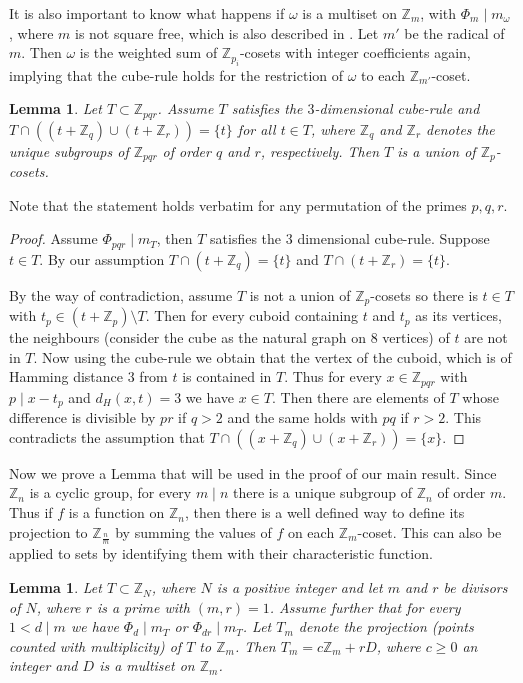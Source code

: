 \documentclass[10pt]{article}
\newcommand{\Z}{\mathbb{Z}}
\newtheorem{lem}[Thme]{Lemma}
\begin{document}
        
        It is also important to know what happens if $\omega$ is a multiset on $\Z_m$, with $\Phi_m \mid m_{\omega}$, where $m$ is not square free, which is also described in \cite{negyen}. Let $m'$ be the radical of $m$. Then $\omega$ is the weighted sum of $\Z_{p_i}$-cosets with integer coefficients again, implying that the cube-rule holds for the restriction of $\omega$ to each $\Z_{m'}$-coset.   
        \begin{lem}\label{lemcuberulecorr}
        Let $T \subset \Z_{pqr}$. Assume $T$ satisfies the $3$-dimensional cube-rule and $T \cap ((t+\Z_q) \cup (t+\Z_r))=\{t\}$ for all $t\in T$, where $\Z_q$ and $\Z_r$ denotes the unique subgroups of $\Z_{pqr}$ of order $q$ and $r$, respectively. Then $T$ is a union of $\Z_p$-cosets.
        \end{lem}
        Note that the statement holds verbatim for any permutation of the primes $p,q,r$.
        \begin{proof}
        Assume $\Phi_{pqr} \mid m_T$, then $T$ satisfies the $3$ dimensional cube-rule. Suppose $t \in T$. By our assumption $T \cap (t+\Z_q)=\{t\}$ and $T \cap (t+\Z_r)=\{t\}$.   
        
        By the way of contradiction, assume $T$ is not a union of $\Z_{p}$-cosets so there is $t \in T$ with $t_p \in (t+\Z_p)\setminus T$. Then for every cuboid containing $t$ and $t_p$ as its vertices, the neighbours (consider the cube as the natural graph on $8$ vertices) of $t$ are not in $T$. Now using the cube-rule we obtain that the vertex of the cuboid, which is of Hamming distance $3$ from $t$ is contained in $T$.
        Thus for every $x \in \Z_{pqr}$ with $p \mid x-t_p$ and $d_H(x,t)=3$ we have $x \in T$. Then there are elements of $T$ whose difference is divisible by $pr$ if $q>2$  and the same holds with  $pq$ if $r>2$. This contradicts the assumption that $T \cap ((x+\Z_q) \cup (x+\Z_r))=\{x\}$.
        \end{proof}
        Now we prove a Lemma that will be used in the proof of our main result. Since $\Z_n$ is a cyclic group, for every $m \mid n$ there is a unique subgroup of $\Z_n$ of order $m$. Thus if $f$ is a function on $\Z_n$, then there is a well defined way to define its projection to $\Z_{\frac{n}{m}}$ by summing the values of $f$ on each $\Z_m$-coset. This can also be applied to sets by identifying them with their characteristic function. 
        \begin{lem}\label{lemprojekcio}
        Let $T \subset \Z_N$, where $N$ is a positive integer and let $m $ and $r$ be divisors of $N$, where $r$ is a prime with $(m,r)=1$. Assume further that for every $1 < d \mid m$ we have $\Phi_d \mid m_T$ or $\Phi_{dr} \mid m_T$. Let $T_m$ denote the projection (points counted with multiplicity) of $T$ to $\Z_m$. Then $T_m=c\Z_m+rD$, where $c \ge 0$ an integer and $D$ is a multiset on $\Z_m$. 
        \end{lem}
\end{document}
